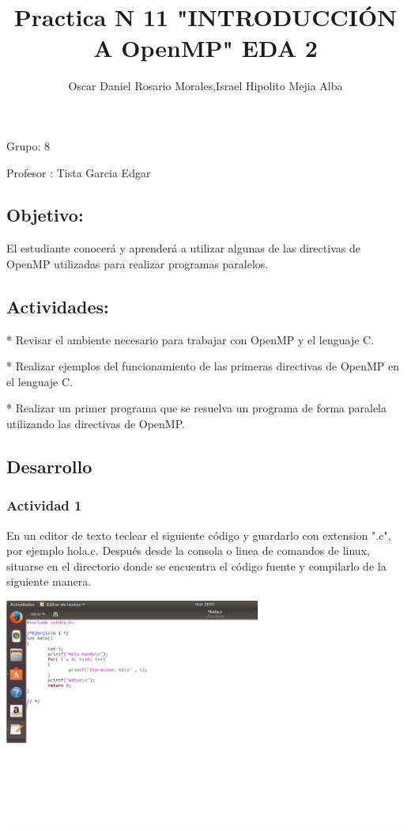 \documentclass[12pt,letterpaper]{article}
\author{Oscar Daniel Rosario Morales,Israel Hipolito Mejia 
Alba}
\title{Practica N 11 "INTRODUCCIÓN A OpenMP" 
EDA 2}
\begin{document}
\maketitle
Grupo: 8 


Profesor : Tista Garcia Edgar

\newpage
\subsection{Objetivo:}
El estudiante conocerá y aprenderá a utilizar algunas de las directivas de OpenMP utilizadas para realizar programas paralelos.

\subsection{Actividades:}
* Revisar el ambiente necesario para trabajar con OpenMP y el lenguaje C.

* Realizar ejemplos del funcionamiento de las primeras directivas de OpenMP en el lenguaje C.

* Realizar un primer programa que se resuelva un programa de forma paralela utilizando las directivas de OpenMP.

\subsection{Desarrollo}
\subsubsection*{Actividad 1} 
En un editor de texto teclear el siguiente código y guardarlo con extension ".c", por ejemplo hola.c. Después desde la consola o linea de comandos de linux, situarse en el directorio donde se encuentra el código fuente y compilarlo de la siguiente manera.


\begin{flushleft}
\includegraphics[scale=1]{ejercicio0.jpg} 

\end{flushleft}
\end{document}

